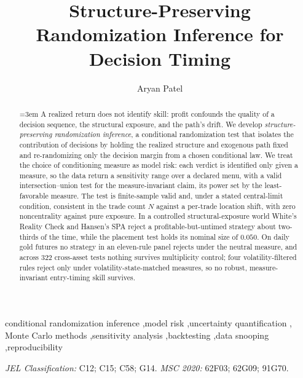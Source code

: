 \documentclass[preprint,12pt]{elsarticle}
\theoremstyle{definition}
\begin{document}
\begin{frontmatter}

\title{Structure-Preserving Randomization Inference for Decision Timing}

\author{Aryan Patel}
\address{Independent Researcher}

\begin{abstract}
\begingroup
\parindent=0pt
\emergencystretch=3em
A realized return does not identify skill: profit confounds the quality of a
decision sequence, the structural exposure, and the path's drift. We develop
\emph{structure-preserving randomization inference}, a conditional randomization test
that isolates the contribution of decisions by holding the realized structure and
exogenous path fixed and re-randomizing only the decision margin from a chosen
conditional law. We treat the choice of conditioning measure as model risk: each
verdict is identified only given a measure, so the data return a sensitivity range over
a declared menu, with a valid intersection--union test for the measure-invariant claim,
its power set by the least-favorable measure. The test is finite-sample valid and, under
a stated central-limit condition, consistent in the trade count $N$ against a per-trade
location shift, with zero noncentrality against pure exposure. In a controlled
structural-exposure world White's Reality Check and Hansen's SPA reject a
profitable-but-untimed strategy about two-thirds of the time, while the placement test
holds its nominal size of $0.050$. On daily gold futures no strategy in an eleven-rule
panel rejects under the neutral measure, and across $322$ cross-asset tests nothing
survives multiplicity control; four volatility-filtered rules reject only under
volatility-state-matched measures, so no robust, measure-invariant entry-timing skill
survives.
\endgroup
\end{abstract}

\begin{keyword}
conditional randomization inference \sep model risk \sep uncertainty quantification \sep
Monte Carlo methods \sep sensitivity analysis \sep backtesting \sep data snooping \sep reproducibility
\end{keyword}

\vspace{2pt}
\noindent\emph{JEL Classification:} C12; C15; C58; G14. \quad
\emph{MSC 2020:} 62F03; 62G09; 91G70.

\end{frontmatter}
\end{document}
